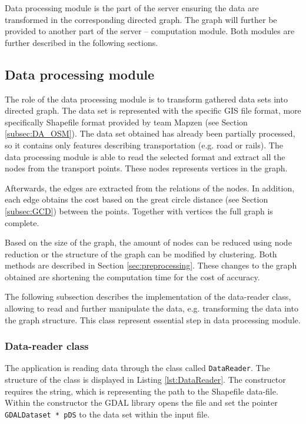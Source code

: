 \documentclass[thesis=M,english]{FITthesis}[2012/10/20]
\begin{document}
Data processing module is the part of the server ensuring the data are transformed in the corresponding directed graph. The graph will further be provided to another part of the server -- computation module. Both modules are further described in the following sections.


\subsection{Data processing module}
\label{subsec:dataprocessing} 
The role of the data processing module is to transform gathered data sets into directed graph. The data set is represented with the specific GIS file format, more specifically Shapefile format provided by team Mapzen (see Section \ref{subsec:DA_OSM}). The data set obtained has already been partially processed, so it contains only features describing transportation (e.g. road or rails). The data processing module is able to read the selected format and extract all the nodes from the transport points. These nodes represents vertices in the graph. 

Afterwards, the edges are extracted from the relations of the nodes. In addition, each edge obtains the cost based on the great circle distance (see Section \ref{subsec:GCD}) between the points. Together with vertices the full graph is complete.

Based on the size of the graph, the amount of nodes can be reduced using node reduction or the structure of the graph can be modified by clustering. Both methods are described in Section \ref{sec:preprocessing}. These changes to the graph obtained are shortening the computation time for the cost of accuracy. 

The following subsection describes the implementation of the data-reader class, allowing to read and further manipulate the data, e.g. transforming the data into the graph structure. This class represent essential step in data processing module.

\subsubsection{Data-reader class}
The application is reading data through the class called \texttt{DataReader}. The structure of the class is displayed in Listing \ref{lst:DataReader}. The constructor requires the string, which is representing the path to the Shapefile data-file. Within the constructor the GDAL library opens the file and set the pointer \texttt{GDALDataset * pDS} to the data set within the input file.
\end{document}
